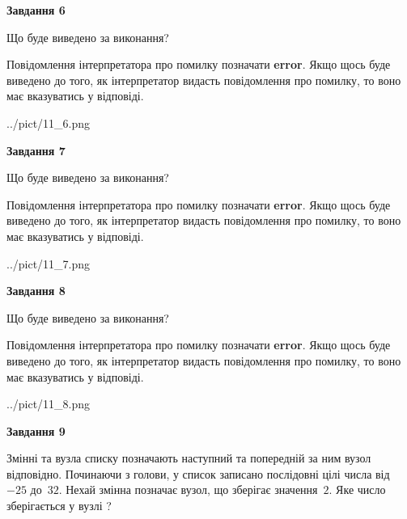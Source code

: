 \documentclass[12pt, ukrainian]{article}
\begin{document}
{\begin {large}
{\begin {center}\textbf{Завдання 6}\end {center}}\par
Що буде виведено за виконання?

Повідомлення інтерпретатора про помилку позначати \textbf{error}.
Якщо щось буде виведено до того, як інтерпретатор видасть повідомлення про помилку, 
то воно має вказуватись у відповіді. \par


\begin{center}
	{../pict/11_6.png}
\end{center}
\newpage

{\begin {center}\textbf{Завдання 7}\end {center}}\par
Що буде виведено за виконання?

Повідомлення інтерпретатора про помилку позначати \textbf{error}.
Якщо щось буде виведено до того, як інтерпретатор видасть повідомлення про помилку, 
то воно має вказуватись у відповіді. \par


\begin{center}
	{../pict/11_7.png}
\end{center}
\newpage

{\begin {center}\textbf{Завдання 8}\end {center}}\par
Що буде виведено за виконання?

Повідомлення інтерпретатора про помилку позначати \textbf{error}.
Якщо щось буде виведено до того, як інтерпретатор видасть повідомлення про помилку, 
то воно має вказуватись у відповіді. \par


\begin{center}
	{../pict/11_8.png}
\end{center}
\newpage

{\begin {center}\textbf{Завдання 9}\end {center}}\par
Змінні  та  вузла списку позначають наступний та попередній за ним вузол відповідно. Починаючи з голови, у список записано послідовні цілі числа від~$-25$ до~$32$. Нехай змінна  позначає вузол, що зберігає значення~$2$.
Яке число зберігається у вузлі  ?\par
\newpage


\end{large}}
\end{document}
